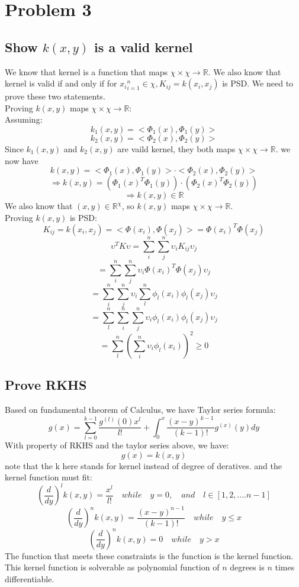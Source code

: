 \documentclass[twoside]{article}
\theoremstyle{definition}
\theoremstyle{definition}
\theoremstyle{remark}
\def\R{{\mathbb R}}
\begin{document}
\section{Problem 3}
\subsection{Show $k(x,y)$ is a valid kernel}
We know that kernel is a function that maps $\chi \times \chi \rightarrow \R$. 
We also know that kernel is valid if and only if for ${x_i}_{i=1}^n \in \chi, K_{ij} = k(x_i,x_j)$ is PSD. We need to prove these two statements.\\ 
Proving $k(x,y)$ maps $\chi \times \chi \rightarrow \R$:\\ 
Assuming:
\[k_1(x,y) = <\Phi_1(x),\Phi_1(y)>\]
\[k_2(x,y) = <\Phi_2(x),\Phi_2(y)>\]
Since $k_1(x,y)$ and $k_2(x,y)$ are vaild kernel, they both maps $\chi \times \chi \rightarrow \R$. 
we now have 
\[k(x,y) = <\Phi_1(x),\Phi_1(y)>\cdot <\Phi_2(x),\Phi_2(y)>\]
\[\Rightarrow k(x,y) = (\Phi_1(x)^T \Phi_1(y))\cdot(\Phi_2(x)^T\Phi_2(y))\]
\[\Rightarrow k(x,y) \in \R\]
We also know that $(x,y) \in \R^\chi$, so $k(x,y)$ maps $\chi \times \chi \rightarrow \R$.\\
Proving $k(x,y)$ is PSD:
\[K_{ij} = k(x_i,x_j) =  <\Phi(x_i),\Phi(x_j)> =\Phi(x_i)^T\Phi(x_j) \]
\[\upsilon^T K \upsilon = \sum_i^n \sum_j^n \upsilon_i K_{ij} \upsilon_j\]
\[=\sum_i^n \sum_j^n \upsilon_i \Phi(x_i)^T\Phi(x_j) \upsilon_j\]
\[=\sum_i^n \sum_j^n \upsilon_i \sum_l^n \phi_l(x_i)\phi_l(x_j) \upsilon_j\]
\[=\sum_l^n \sum_i^n \sum_j^n \upsilon_i \phi_l(x_i)\phi_l(x_j) \upsilon_j\]
\[=\sum_l^n(\sum_i^n \upsilon_i \phi_l(x_i))^2 \geq 0\]
\subsection{Prove RKHS}
Based on fundamental theorem of Calculus, we have Taylor series formula:
\[ g(x) = \sum_{l=0}^{k-1}\frac{g^{(l)}(0)x^l}{l!} + \int_{0}^{x} \frac{(x-y)^{k-1}}{(k-1)!}g^{(x)}(y)dy\]
With property of RKHS and the taylor series above, we have:
\[g(x) = k(x,y) \]
note that the k here stands for kernel instead of degree of deratives.
and the kernel function must fit:
\[(\frac{d}{dy})^l k(x,y) = \frac{x^l}{l!} \quad while\quad y = 0 ,\quad and\quad l \in [1,2,....n-1]\]
\[(\frac{d}{dy})^{n} k(x,y) = \frac{(x-y)^{n-1}}{(k-1)!} \quad while\quad y \leq x\]
\[(\frac{d}{dy})^{n} k(x,y) = 0 \quad while\quad y > x\]
The function that meets these constraints is the function is the kernel function. This kernel function is solverable as polynomial function of $n$ degrees is $n$ times differentiable.
\end{document}
